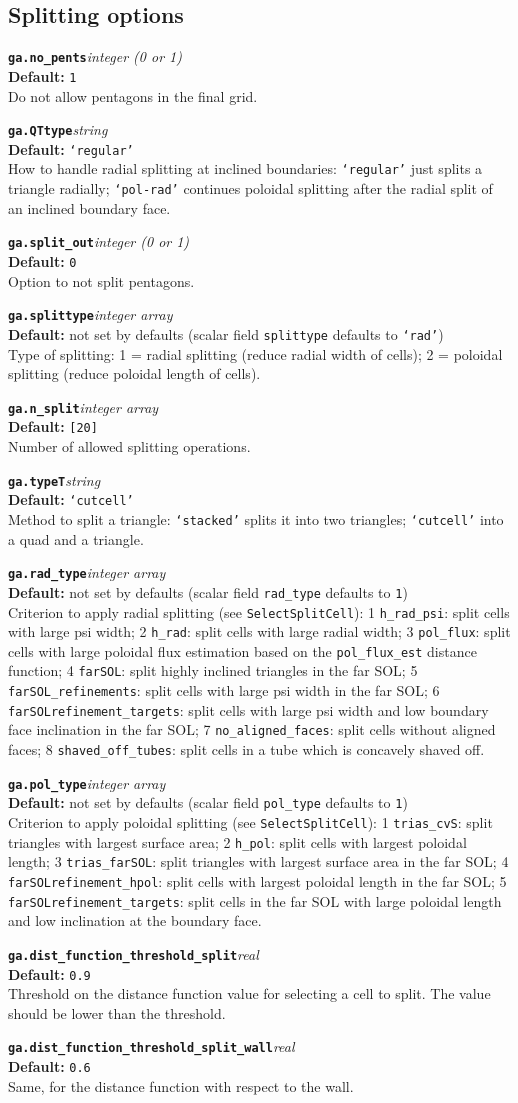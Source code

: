 \documentclass[10pt,a4paper]{article}
\newcommand{\sw}[4]{%
  \par\vspace{0.7em}%
  \begin{minipage}{\linewidth}\raggedright
    \textbf{\texttt{#1}}\hfill\textit{#2}\\[0.1em]
    \textbf{Default:} #3\\[0.1em]
    #4\par
    \vspace{0.3em}{\color{swgrey}\hrule}
  \end{minipage}\par}
\begin{document}
\subsection*{Splitting options}
\sw{ga.no_pents}{integer (0 or 1)}{\texttt{1}}{Do not allow pentagons in the final grid.}
\sw{ga.QTtype}{string}{\texttt{`regular'}}{How to handle radial splitting at inclined boundaries: \texttt{`regular'} just splits a triangle radially; \texttt{`pol-rad'} continues poloidal splitting after the radial split of an inclined boundary face.}
\sw{ga.split_out}{integer (0 or 1)}{\texttt{0}}{Option to not split pentagons.}
\sw{ga.splittype}{integer array}{not set by defaults (scalar field \texttt{splittype} defaults to \texttt{`rad'})}{Type of splitting: 1 = radial splitting (reduce radial width of cells); 2 = poloidal splitting (reduce poloidal length of cells).}
\sw{ga.n_split}{integer array}{\texttt{[20]}}{Number of allowed splitting operations.}
\sw{ga.typeT}{string}{\texttt{`cutcell'}}{Method to split a triangle: \texttt{`stacked'} splits it into two triangles; \texttt{`cutcell'} into a quad and a triangle.}
\sw{ga.rad_type}{integer array}{not set by defaults (scalar field \texttt{rad\_type} defaults to \texttt{1})}{Criterion to apply radial splitting (see \texttt{SelectSplitCell}):
1 \texttt{h\_rad\_psi}: split cells with large psi width;
2 \texttt{h\_rad}: split cells with large radial width;
3 \texttt{pol\_flux}: split cells with large poloidal flux estimation based on the \texttt{pol\_flux\_est} distance function;
4 \texttt{farSOL}: split highly inclined triangles in the far SOL;
5 \texttt{farSOL\_refinements}: split cells with large psi width in the far SOL;
6 \texttt{farSOLrefinement\_targets}: split cells with large psi width and low boundary face inclination in the far SOL;
7 \texttt{no\_aligned\_faces}: split cells without aligned faces;
8 \texttt{shaved\_off\_tubes}: split cells in a tube which is concavely shaved off.}
\sw{ga.pol_type}{integer array}{not set by defaults (scalar field \texttt{pol\_type} defaults to \texttt{1})}{Criterion to apply poloidal splitting (see \texttt{SelectSplitCell}):
1 \texttt{trias\_cvS}: split triangles with largest surface area;
2 \texttt{h\_pol}: split cells with largest poloidal length;
3 \texttt{trias\_farSOL}: split triangles with largest surface area in the far SOL;
4 \texttt{farSOLrefinement\_hpol}: split cells with largest poloidal length in the far SOL;
5 \texttt{farSOLrefinement\_targets}: split cells in the far SOL with large poloidal length and low inclination at the boundary face.}
\sw{ga.dist_function_threshold_split}{real}{\texttt{0.9}}{Threshold on the distance function value for selecting a cell to split. The value should be lower than the threshold.}
\sw{ga.dist_function_threshold_split_wall}{real}{\texttt{0.6}}{Same, for the distance function with respect to the wall.}
\end{document}
